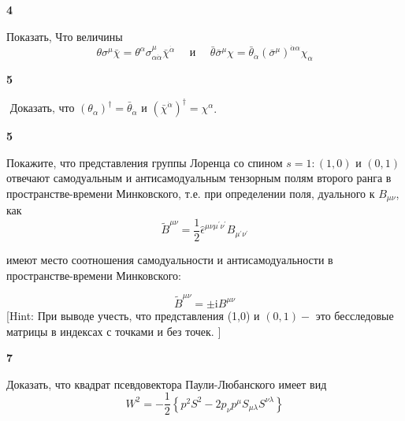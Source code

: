 \documentclass[a4paper,12pt]{article} %
\begin{document}
\begin{task}\textbf{4}

Показать, Что величины
$$
\theta \sigma^{\mu} \bar{\chi}=\theta^{\alpha} \sigma_{\alpha \dot{\alpha}}^{\mu} \bar{\chi}^{\dot{\alpha}} \quad \text { и } \quad \bar{\theta} \bar{\sigma}^{\mu} \chi=\bar{\theta}_{\dot{\alpha}}\left(\bar{\sigma}^{\mu}\right)^{\dot{\alpha} \alpha} \chi_{\alpha}
$$


\end{task}



\begin{task}\textbf{5}
	
$\text { Доказать, что }\left(\theta_{\alpha}\right)^{\dagger}=\bar{\theta}_{\dot{\alpha}} \text { и }\left(\bar{\chi}^{\dot{\alpha}}\right)^{\dagger}=\chi^{\alpha}$.



\end{task}



\begin{task}\textbf{5}

Покажите, что представления группы Лоренца со спином $s = 1:
(1, 0)$ и $(0, 1)$ отвечают самодуальным и антисамодуальным тензорным
полям второго ранга в пространстве-времени Минковского, т.е. при
определении поля, дуального к $ B_{\mu\nu}$, как
$$
\tilde{B}^{\mu \nu}=\frac{1}{2} \hat{\epsilon}^{\mu \nu \mu^{\prime} \nu^{\prime}} B_{\mu^{\prime} \nu^{\prime}}
$$

имеют место соотношения самодуальности и антисамодуальности в
пространстве-времени Минковского:

$$
\tilde{B}^{\mu \nu}=\pm \mathrm{i} B^{\mu \nu}
$$
[Hint: При выводе учесть, что представления (1,0) и $(0,1)-$ это бесследовые матрицы в индексах с точками и без точек. $]$







\end{task}


\begin{task}\textbf{7}

Доказать, что квадрат псевдовектора Паули-Любанского имеет вид
$$
W^{2}=-\frac{1}{2}\left\{p^{2} S^{2}-2 p_{\nu} p^{\mu} S_{\mu \lambda} S^{\nu \lambda}\right\}
$$








\end{task}
\end{document}
